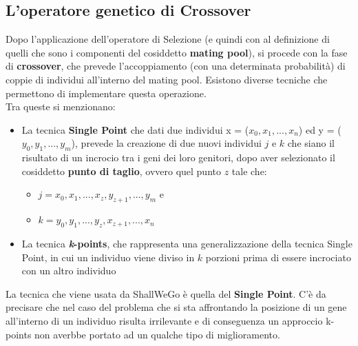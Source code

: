     \subsection{L'operatore genetico di Crossover}
        Dopo l'applicazione dell'operatore di Selezione (e quindi con al definizione di quelli che sono i componenti del cosiddetto \textbf{mating pool}), si procede con la fase di \textbf{crossover}, che prevede l'accoppiamento (con una determinata probabilità) di coppie di individui all'interno del mating pool. 
        Esistono diverse tecniche che permettono di implementare questa operazione. \\
        Tra queste si menzionano: \cite{}

        \begin{itemize}
            \item La tecnica \textbf{Single Point} che dati due individui x = ($x_{0}, x_{1}, ..., x_{n}$) ed y = ($y_{0}, y_{1}, ..., y_{m}$), prevede la creazione di due nuovi individui $j$ e $k$ che siano il risultato di un incrocio tra i geni dei loro genitori, dopo aver selezionato il cosiddetto \textbf{punto di taglio}, ovvero quel punto $z$ tale che:
                \begin{itemize}
                    \item $j = x_{0}, x_{1}, ..., x_{z}, y_{z+1}, ..., y_{m}$ e
                    \item $k = y_{0}, y_{1}, ..., y_{z}, x_{z+1}, ..., x_{n}$
                \end{itemize}
            \item La tecnica \textbf{\textit{k}-points}, che rappresenta una generalizzazione della tecnica Single Point, in cui un individuo viene diviso in \textit{$k$} porzioni prima di essere incrociato con un altro individuo
        \end{itemize}
        La tecnica che viene usata da ShallWeGo è quella del \textbf{Single Point}. C'è da precisare che nel caso del problema che si sta affrontando la posizione di un gene all'interno di un individuo risulta irrilevante e di conseguenza un approccio k-points non averbbe portato ad un qualche tipo di miglioramento.
